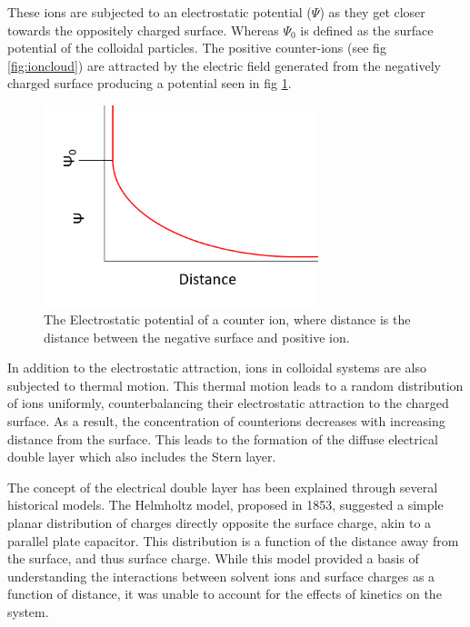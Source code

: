 These ions are subjected to an electrostatic potential ($\Psi$) as they get closer towards the oppositely charged surface. Whereas \( \Psi_0 \) is defined as the surface potential of the colloidal particles. The positive counter-ions (see fig \ref{fig:ioncloud}) are attracted by the electric field generated from the negatively charged surface producing a potential seen in fig \ref{fig:psi}. 

\begin{figure}[h]    
        \begin{center}
          \includegraphics[width=80mm]{chapter1/psi.PNG}
\end{center}
\caption{The Electrostatic potential of a counter ion, where distance is the distance between the negative surface and positive ion.}
\label{fig:psi}                
\end{figure}


In addition to the electrostatic attraction, ions in colloidal systems are also subjected to thermal motion. This thermal motion leads to a random distribution of ions uniformly, counterbalancing their electrostatic attraction to the charged surface. As a result, the concentration of counterions decreases with increasing distance from the surface. This leads to the formation of the diffuse electrical double layer which also includes the Stern layer. 

The concept of the electrical double layer has been explained through several historical models. The Helmholtz model, proposed in 1853, suggested a simple planar distribution of charges directly opposite the surface charge, akin to a parallel plate capacitor. This distribution is a function of the distance away from the surface, and thus surface charge. While this model provided a basis of understanding the interactions between solvent ions and surface charges as a function of distance, it was unable to account for the effects of kinetics on the system.

